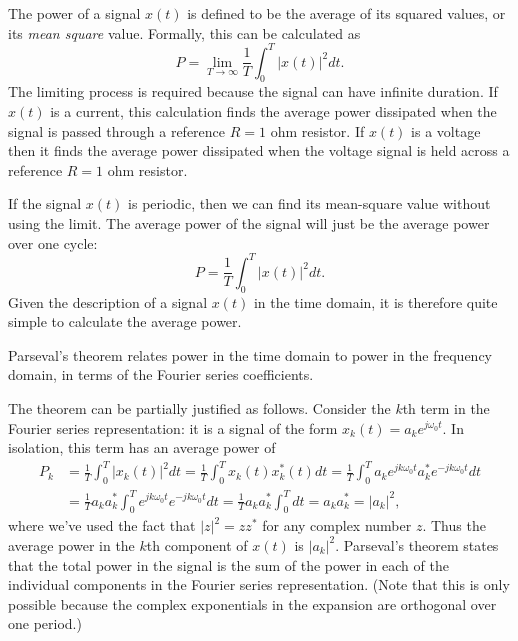 \documentclass[10pt]{beamer}
\begin{document}
The power of a signal $x(t)$ is defined to be the average of its squared values, or its {\em mean square} value.  Formally, this can be calculated as
\begin{equation*}
  P = \lim_{T \to \infty} \frac{1}{T} \int_0^T |x(t)|^2 dt.
\end{equation*}
The limiting process is required because the signal can have infinite duration.  If $x(t)$ is a current, this calculation finds the average power dissipated when the signal is passed through a reference $R=1$ ohm resistor.  If $x(t)$ is a voltage then it finds the average power dissipated when the voltage signal is held across a reference $R=1$ ohm resistor.

If the signal $x(t)$ is periodic, then we can find its mean-square value without using the limit.  The average power of the signal will just be the average power over one cycle:
\begin{equation*}
  P = \frac{1}{T} \int_0^T |x(t)|^2 dt.
\end{equation*}
Given the description of a signal $x(t)$ in the time domain, it is therefore quite simple to calculate the average power.

Parseval's theorem relates power in the time domain to power in the frequency domain, in terms of the Fourier series coefficients.  

\begin{center}
\end{center}

The theorem can be partially justified as follows.  Consider the $k$th term in the Fourier series representation:  it is a signal of the form $x_k(t) = a_k e^{j \omega_0 t}$.  In isolation, this term has an average power of
\begin{align*}
  P_k &= \frac{1}{T} \int_0^T |x_k(t)|^2 dt = \frac{1}{T} \int_0^T x_k(t) x_k^{\ast}(t) dt 
  = \frac{1}{T} \int_0^T a_k e^{j k \omega_0 t} a_k^{\ast} e^{-j k \omega_0 t} dt \\
  &= \frac{1}{T} a_k a_k^{\ast} \int_0^T e^{j k \omega_0 t} e^{-j k \omega_0 t} dt
  = \frac{1}{T} a_k a_k^{\ast} \int_0^T dt = a_k a_k^{\ast} = |a_k|^2,
\end{align*}
where we've used the fact that $|z|^2 = z z^{\ast}$ for any complex number $z$.  Thus the average power in the $k$th component of $x(t)$ is $|a_k|^2$.  Parseval's theorem states that the total power in the signal is the sum of the power in each of the individual components in the Fourier series representation.  (Note that this is only possible because the complex exponentials in the expansion are orthogonal over one period.)
\end{document}
